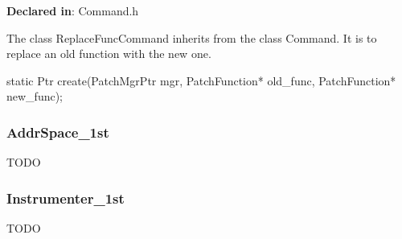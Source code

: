 \textbf{Declared in}: Command.h

The class ReplaceFuncCommand inherits from the class Command. It is to replace
an old function with the new one.


\begin{apient}
static Ptr create(PatchMgrPtr mgr, PatchFunction* old_func, PatchFunction* new_func);
\end{apient}


\subsubsection{AddrSpace\_1st}
\label{sec-3.3.6}


TODO

\subsubsection{Instrumenter\_1st}
\label{sec-3.3.7}


TODO
